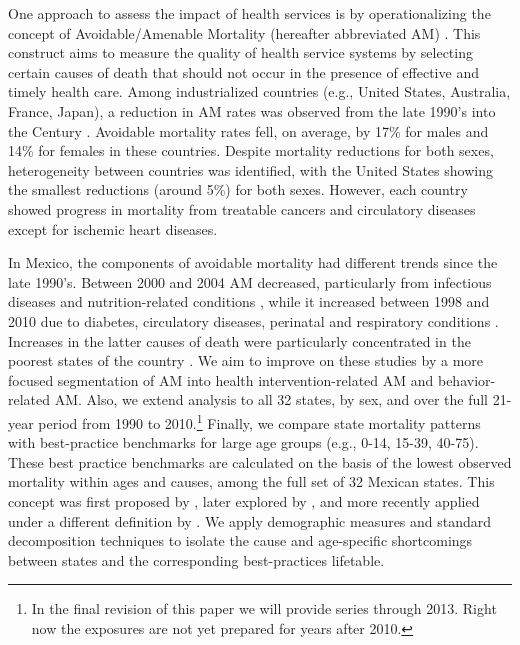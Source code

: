 \documentclass{article}
\begin{document}
 One approach to assess the impact of health services is by operationalizing the
 concept of Avoidable/Amenable Mortality (hereafter abbreviated AM)
 \citep{nolte&mckee2004, nolte&mckee2008}. This construct aims to measure the quality of health service systems by selecting certain
 causes of death that should not occur in the presence of effective and
 timely health care. Among industrialized countries (e.g., United States,
 Australia, France, Japan), a reduction in AM rates was
 observed from the late 1990's into the  Century
 \citep{nolte&mckee2008}. Avoidable mortality rates fell, on average, by 17\%
 for males and 14\% for females in these countries. Despite mortality reductions for
 both sexes, heterogeneity between countries was identified, with the United
 States showing the smallest reductions (around 5\%) for both sexes. However,
 each country showed progress in mortality from treatable cancers and
 circulatory diseases except for ischemic heart diseases.

In Mexico, the components of avoidable mortality had different trends since the
late 1990's. Between 2000 and 2004 AM decreased, particularly from
infectious diseases and nutrition-related conditions \citep{francomarina2006}, while it increased between 1998 and 2010 due to diabetes, circulatory diseases, perinatal and respiratory conditions
\citep{agudelo2014efecto}. Increases in the latter causes
of death were particularly concentrated in the poorest states of the country
\citep{davila2014mortalidad}. We aim to improve on these studies
by a more focused segmentation of AM into health intervention-related AM and
behavior-related AM. Also, we extend analysis to all 32 states, by sex, and over
the full 21-year period from 1990 to 2010.\footnote{In the final revision of
this paper we will provide series through 2013. Right now the exposures are not
yet prepared for years after 2010.} Finally, we compare state mortality patterns
with best-practice benchmarks for large age groups (e.g., 0-14, 15-39, 40-75). These best practice
benchmarks are calculated on the basis of the lowest observed mortality within
ages and causes, among the full set of 32 Mexican states. This concept was first
proposed by \citet{wunsch1975minimum}, later explored by
\citet{vallin2008minimum}, and more recently applied under a different
definition by \citet{eikemo2014}. We apply demographic measures and
standard decomposition techniques to isolate the cause and age-specific shortcomings between states and the corresponding best-practices lifetable. 
\end{document}
